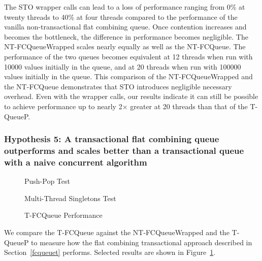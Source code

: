 The STO wrapper calls can lead to a loss of performance ranging from 0\% at twenty threads to 40\% at four threads compared to the performance of the vanilla non-transactional flat combining queue. Once contention increases and becomes the bottleneck, the difference in performance becomes negligible. The NT-FCQueueWrapped scales nearly equally as well as the NT-FCQueue. The performance of the two queues becomes equivalent at 12 threads when run with 10000 values initially in the queue, and at 20 threads when run with 100000 values initially in the queue. This comparison of the NT-FCQueueWrapped and the NT-FCQueue demonstrates that STO introduces negligible necessary overhead. Even with the wrapper calls, our results indicate it can still be possible to achieve performance up to nearly 2$\times$ greater at 20 threads than that of the T-QueueP.

\vspace{12pt}
\noindent{}

\subsubsection{Hypothesis 5: A transactional flat combining queue outperforms and scales better than a transactional queue with a naive concurrent algorithm}

\begin{figure}[H]
    \centering
	\begin{minipage}{0.75\textwidth}
        \caption*{Push-Pop Test}
        \vspace{12pt}
	\end{minipage}
   	\begin{minipage}{0.75\textwidth}
        \caption*{Multi-Thread Singletons Test}
	\end{minipage}
        \caption{T-FCQueue Performance}
    \label{fig:tqs}
\end{figure}

We compare the T-FCQueue against the NT-FCQueueWrapped and the T-QueueP to measure how the flat combining transactional approach described in Section~\ref{fcqueuet} performs. Selected results are shown in Figure~\ref{fig:tqs}.

